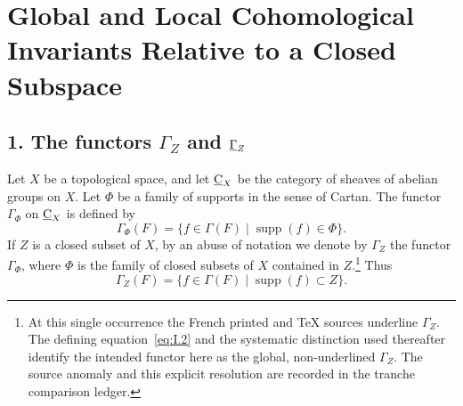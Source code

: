 
\makeatletter
\providecommand{\sgareaderlabel}[2]{%
  \begingroup
  \def\@currentlabel{#2}%
  \phantomsection\label{#1}%
  \endgroup}
\makeatother

\chapter[Global and Local Cohomological Invariants]
{Global and Local Cohomological Invariants Relative to a Closed Subspace}
\label{I}

\section*{1. The functors $\Gamma_Z$ and $\mathop{\underline{\Gamma}}\nolimits_Z$}
\sgareaderlabel{I.1}{1}

Let $X$ be a topological space, and let $\underline{\mathrm C}_X$ be the category of
sheaves of abelian groups on $X$.  Let $\Phi$ be a family of supports in
the sense of Cartan.  The functor $\Gamma_\Phi$ on $\underline{\mathrm C}_X$ is defined by
\begin{equation}
  \Gamma_\Phi(F)
  =\{f\in\Gamma(F)\mid \operatorname{supp}(f)\in\Phi\}.
  \tag{1}\label{eq:I.1}
\end{equation}
If $Z$ is a closed subset of $X$, by an abuse of notation we denote by
$\Gamma_Z$ the functor $\Gamma_\Phi$, where $\Phi$ is the family of
closed subsets of $X$ contained in $Z$.\footnote{At this single occurrence
the French printed and TeX sources underline $\Gamma_Z$.  The defining
equation~\eqref{eq:I.2} and the systematic distinction used thereafter
identify the intended functor here as the global, non-underlined $\Gamma_Z$.
The source anomaly and this explicit resolution are recorded in the tranche
comparison ledger.}
Thus
\begin{equation}
  \Gamma_Z(F)
  =\{f\in\Gamma(F)\mid \operatorname{supp}(f)\subset Z\}.
  \tag{2}\label{eq:I.2}
\end{equation}

